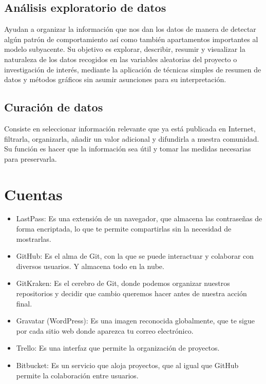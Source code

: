 \documentclass[12pt,letterpaper]{article}
\begin{document}
\subsection*{Análisis exploratorio de datos}
Ayudan a organizar la información que nos dan los datos de manera de detectar
algún patrón de comportamiento así como también apartamentos importantes al
modelo subyacente.
\citep{orella_analisis_exploratorio}
Su objetivo es explorar, describir, resumir y visualizar la naturaleza de los
datos recogidos en las variables aleatorias del proyecto o investigación de
interés, mediante la aplicación de técnicas simples de resumen de datos y
métodos gráficos sin asumir asunciones para su interpretación.
\citep{heix_bios_analisis_exploratorio}

\subsection*{Curación de datos}
Consiste en seleccionar informaci\'on relevante que ya está publicada en
Internet, filtrarla, organizarla, añadir un valor adicional y difundirla a
nuestra comunidad.
\citep{duro_2017}
Su función es hacer que la información sea útil y tomar las medidas necesarias
para preservarla.
\citep{it_user_2020}

\section*{Cuentas}
\begin{itemize}
\item LastPass: Es una extensión de un navegador, que almacena las contraseñas de forma encriptada, lo que te permite compartirlas sin la necesidad de mostrarlas.
\item GitHub: Es el alma de Git, con la que se puede interactuar y colaborar con diversos usuarios. Y almacena todo en la nube.
\item GitKraken: Es el cerebro de Git, donde podemos organizar nuestros repositorios y decidir que cambio queremos hacer antes de nuestra acción final.
\item Gravatar (WordPress): Es una imagen reconocida globalmente, que te sigue por cada sitio web donde aparezca tu correo electrónico.
\item Trello: Es una interfaz que permite la organización de proyectos.
\item Bitbucket: Es un servicio que aloja proyectos, que al igual que GitHub permite la colaboración entre usuarios.
\end{itemize}

 

\end{document}
